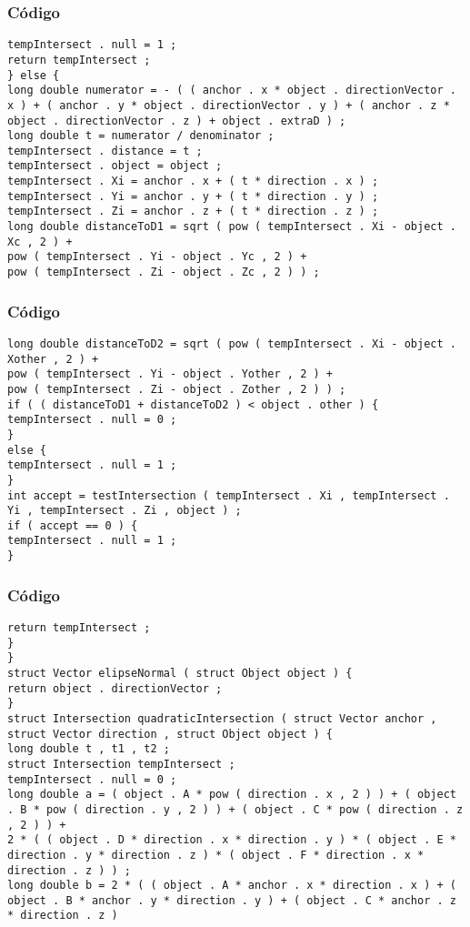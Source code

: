 \documentclass{beamer}
\begin{document}
\begin{frame}[fragile]
\frametitle{C\'odigo}
\begin{verbatim}
tempIntersect . null = 1 ; 
return tempIntersect ; 
} else { 
long double numerator = - ( ( anchor . x * object . directionVector . x ) + ( anchor . y * object . directionVector . y ) + ( anchor . z * object . directionVector . z ) + object . extraD ) ; 
long double t = numerator / denominator ; 
tempIntersect . distance = t ; 
tempIntersect . object = object ; 
tempIntersect . Xi = anchor . x + ( t * direction . x ) ; 
tempIntersect . Yi = anchor . y + ( t * direction . y ) ; 
tempIntersect . Zi = anchor . z + ( t * direction . z ) ; 
long double distanceToD1 = sqrt ( pow ( tempIntersect . Xi - object . Xc , 2 ) + 
pow ( tempIntersect . Yi - object . Yc , 2 ) + 
pow ( tempIntersect . Zi - object . Zc , 2 ) ) ; 
\end{verbatim}
\end{frame}
\begin{frame}[fragile]
\frametitle{C\'odigo}
\begin{verbatim}
long double distanceToD2 = sqrt ( pow ( tempIntersect . Xi - object . Xother , 2 ) + 
pow ( tempIntersect . Yi - object . Yother , 2 ) + 
pow ( tempIntersect . Zi - object . Zother , 2 ) ) ; 
if ( ( distanceToD1 + distanceToD2 ) < object . other ) { 
tempIntersect . null = 0 ; 
} 
else { 
tempIntersect . null = 1 ; 
} 
int accept = testIntersection ( tempIntersect . Xi , tempIntersect . Yi , tempIntersect . Zi , object ) ; 
if ( accept == 0 ) { 
tempIntersect . null = 1 ; 
} 
\end{verbatim}
\end{frame}
\begin{frame}[fragile]
\frametitle{C\'odigo}
\begin{verbatim}
return tempIntersect ; 
} 
} 
struct Vector elipseNormal ( struct Object object ) { 
return object . directionVector ; 
} 
struct Intersection quadraticIntersection ( struct Vector anchor , struct Vector direction , struct Object object ) { 
long double t , t1 , t2 ; 
struct Intersection tempIntersect ; 
tempIntersect . null = 0 ; 
long double a = ( object . A * pow ( direction . x , 2 ) ) + ( object . B * pow ( direction . y , 2 ) ) + ( object . C * pow ( direction . z , 2 ) ) + 
2 * ( ( object . D * direction . x * direction . y ) * ( object . E * direction . y * direction . z ) * ( object . F * direction . x * direction . z ) ) ; 
long double b = 2 * ( ( object . A * anchor . x * direction . x ) + ( object . B * anchor . y * direction . y ) + ( object . C * anchor . z * direction . z ) 
\end{verbatim}
\end{frame}
\end{document}
